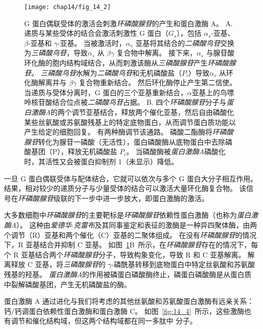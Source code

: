 \begin{figure}[htbp]
	\centering
	\texttt{[image: chap14/fig\_14\_2]}
	\caption{G 蛋白偶联受体的激活会刺激\textit{环磷酸腺苷}的产生和蛋白激酶 A\cite{alberts2017molecular}。
		A. 递质与某些受体的结合会激活刺激性 G 蛋白（$ G_s $），包括 $\alpha_s$-亚基、$\beta$-亚基和 $\gamma$-亚基。
		当被激活时，$\alpha_s$ 亚基将其结合的\textit{二磷酸鸟苷}交换为\textit{三磷酸鸟苷}，导致$\alpha_s$ 从 $\beta \gamma$ 复合物中解离。
		接下来，$\alpha_s$ 与腺苷酸环化酶的胞内结构域结合，从而刺激该酶从\textit{三磷酸腺苷}产生\textit{环磷酸腺苷}。
		\textit{三磷酸鸟苷}水解为\textit{二磷酸鸟苷}和无机磷酸盐（$ P_i $）导致$\alpha_s$ 从环化酶解离并与 $\beta \gamma$ 复合物重新结合。
		然后环化酶停止产生第二信使。
		当递质与受体分离时，G 蛋白的三个亚基重新结合，$\alpha$亚基上的鸟嘌呤核苷酸结合位点被\textit{二磷酸鸟苷}占据。
		B. 四个\textit{环磷酸腺苷}分子与\textit{蛋白激酶A}的两个调节亚基结合，释放两个催化亚基，然后自由磷酸化某些丝氨酸或苏氨酸残基上的特定底物蛋白，从而调节蛋白质功能以产生给定的细胞回复。
		有两种酶调节该通路。
		磷酸二酯酶将\textit{环磷酸腺苷}转化为腺苷一磷酸（无活性），蛋白磷酸酶从底物蛋白中去除磷酸基团（P），释放无机磷酸盐 $ P_i $。
		当磷酸酶被\textit{蛋白激酶A}磷酸化时，其活性又会被蛋白抑制剂 1（未显示）降低。}
	\label{fig:14_2}
\end{figure}


一旦 G 蛋白偶联受体与配体结合，它就可以依次与多个 G 蛋白大分子相互作用。
结果，相对较少的递质分子与少量受体的结合可以激活大量环化酶复合物。
该信号在\textit{环磷酸腺苷}级联的下一步中进一步放大，即蛋白激酶的激活。


大多数细胞中\textit{环磷酸腺苷}的主要靶标是\textit{环磷酸腺苷}依赖性蛋白激酶（也称为\textit{蛋白激酶A}）。
这种由\textit{爱德华$\cdot$克雷布}及其同事鉴定和表征的激酶是一种异四聚体酶，由两个调节（R）亚基和两个催化（C）亚基的二聚体组成。
在没有\textit{环磷酸腺苷}的情况下，R 亚基结合并抑制 C 亚基。
如图~\ref{fig:14_2}B~所示，在\textit{环磷酸腺苷}存在的情况下，每个 R 亚基结合两个\textit{环磷酸腺苷}分子，导致构象变化，导致 R 和 C 亚基解离。
解离释放 C 亚基，将\textit{三磷酸腺苷}的 $\gamma$-磷酰基转移到底物蛋白中特定丝氨酸和苏氨酸残基的羟基。
\textit{蛋白激酶A}的作用被磷蛋白磷酸酶终止，磷蛋白磷酸酶是从蛋白质中裂解磷酸基团，产生无机磷酸盐的酶。


蛋白激酶 A 通过进化与我们将考虑的其他丝氨酸和苏氨酸蛋白激酶有远亲关系：钙/钙调蛋白依赖性蛋白激酶和蛋白激酶 C。
如图~\ref{fig:14_4}~所示，这些激酶也有调节和催化结构域，但这两个结构域都在同一多肽中 分子。


